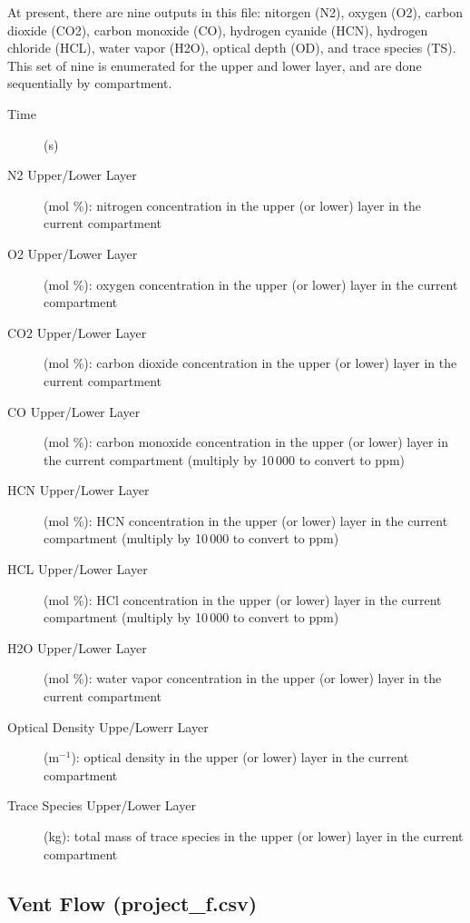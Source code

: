 At present, there are nine outputs in this file: nitorgen (N2), oxygen (O2), carbon dioxide (CO2), carbon monoxide (CO),  hydrogen cyanide (HCN), hydrogen chloride (HCL), water vapor (H2O), optical depth (OD), and trace species (TS). This set of nine is enumerated for the upper and lower layer, and are done sequentially by compartment.
\begin{description}
\item[Time] (s)
\item[N2 Upper/Lower Layer] (mol \%): nitrogen concentration in the upper (or lower) layer in the current compartment
\item[O2 Upper/Lower Layer] (mol \%): oxygen concentration in the upper (or lower) layer in the current compartment
\item[CO2 Upper/Lower Layer] (mol \%):  carbon dioxide concentration in the upper (or lower) layer in the current compartment
\item[CO Upper/Lower Layer] (mol \%):  carbon monoxide concentration in the upper (or lower) layer in the current compartment (multiply by 10\,000 to convert to ppm)
\item[HCN Upper/Lower Layer] (mol \%):  HCN concentration in the upper (or lower) layer in the current compartment (multiply by 10\,000 to convert to ppm)
\item[HCL Upper/Lower Layer] (mol \%):  HCl concentration in the upper (or lower) layer in the current compartment (multiply by 10\,000 to convert to ppm)
\item[H2O Upper/Lower Layer] (mol \%):  water vapor concentration in the upper (or lower) layer in the current compartment
\item[Optical Density Uppe/Lowerr Layer] (m$^{-1}$):  optical density in the upper (or lower) layer in the current compartment
\item[Trace Species Upper/Lower Layer] (kg):  total mass of trace species in the upper (or lower) layer in the current compartment
\end{description}

\subsection{Vent Flow (project\_f.csv)}

